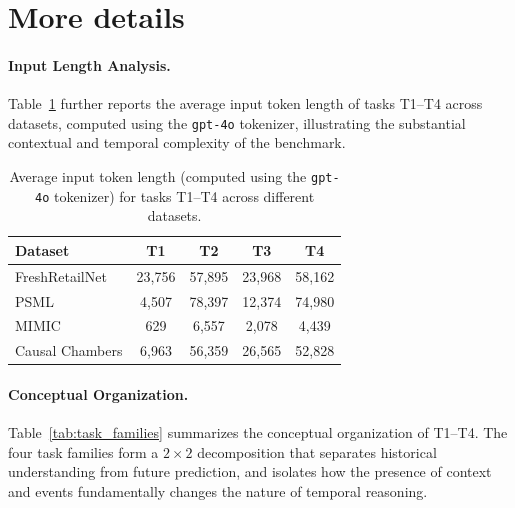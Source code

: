 
\newpage
\appendix
\section{More details}



\paragraph{Input Length Analysis.}Table~\ref{tab:token_length_by_dataset} further reports the average input token length of tasks T1--T4 across datasets, computed using the \texttt{gpt-4o} tokenizer, illustrating the substantial contextual and temporal complexity of the benchmark.


\begin{table}[htbp]
\centering
\footnotesize
\setlength{\tabcolsep}{6pt}
\renewcommand{\arraystretch}{1.15}
\begin{tabular}{lcccc}
\toprule
\textbf{Dataset} & \textbf{T1} & \textbf{T2} & \textbf{T3} & \textbf{T4} \\
\midrule
FreshRetailNet   & 23{,}756 & 57{,}895 & 23{,}968 & 58{,}162 \\
PSML             & 4{,}507  & 78{,}397 & 12{,}374 & 74{,}980 \\
MIMIC            & 629      & 6{,}557  & 2{,}078  & 4{,}439  \\
Causal Chambers  & 6{,}963  & 56{,}359 & 26{,}565 & 52{,}828 \\
\bottomrule
\end{tabular}
\caption{Average input token length (computed using the \texttt{gpt-4o} tokenizer) for tasks T1--T4 across different datasets.}
\label{tab:token_length_by_dataset}
\vspace{-10pt}
\end{table}
\paragraph{Conceptual Organization.}
Table~\ref{tab:task_families} summarizes the conceptual organization of T1–T4.
The four task families form a $2\times2$ decomposition that separates historical understanding from future prediction, and isolates how the presence of context and events fundamentally changes the nature of temporal reasoning.



